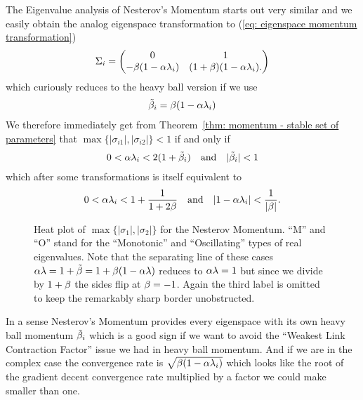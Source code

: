 The Eigenvalue analysis of Nesterov's Momentum starts out very similar and we
easily obtain the analog eigenspace transformation to (\ref{eq: eigenspace
momentum transformation})
%
\begin{align*}
	\Sigma_i = \begin{pmatrix}
		0 & 1\\
		-\beta(1-\alpha\lambda_i) & (1+\beta)(1-\alpha\lambda_i).
	\end{pmatrix}	
\end{align*}
%
which curiously reduces to the heavy ball version if we use
\begin{align}\label{eq: tilde momentum}
	\tilde{\beta}_i = \beta(1-\alpha\lambda_i)
\end{align}
We therefore immediately get from Theorem~\ref{thm: momentum - stable set of
parameters} that \(\max\{|\sigma_{i1}|,|\sigma_{i2}|\}<1\) if and only if
\begin{align*}
	0<\alpha\lambda_i < 2(1+\tilde{\beta}_i)
	\quad \text{and} \quad
	|\tilde{\beta}_i|<1
\end{align*}
%
which after some transformations is itself equivalent to
\begin{align*}
	0<\alpha\lambda_i < 1+\frac{1}{1+2\beta}
	\quad \text{and} \quad
	|1-\alpha\lambda_i|<\frac{1}{|\beta|}.
\end{align*}
%
\begin{figure}[h]
	\centering
	\def\svgwidth{1\textwidth}
	
	\caption{
		Heat plot of \(\max\{|\sigma_1|,|\sigma_2|\}\) for the Nesterov Momentum.
		``M'' and ``O'' stand for the ``Monotonic'' and ``Oscillating'' types of 
		real eigenvalues. Note that the separating line of these cases
		\(\alpha\lambda=1+\tilde{\beta}=1+\beta(1-\alpha\lambda)\)
		reduces to \(\alpha\lambda=1\) but since we divide by \(1+\beta\)
		the sides flip at \(\beta=-1\). Again the third label is omitted to
		keep the remarkably sharp border unobstructed.
	}
	\label{fig: annotated nesterov rates}
\end{figure}

In a sense Nesterov's Momentum provides every eigenspace with its own
heavy ball momentum \(\tilde{\beta}_i\) which is a good sign if we want
to avoid the ``Weakest Link Contraction Factor'' issue we had in heavy ball
momentum. And if we are in the complex case the convergence rate is
\(\sqrt{\beta(1-\alpha\lambda_i)}\) which looks like the root of the gradient
decent convergence rate multiplied by a factor we could make smaller than one.

